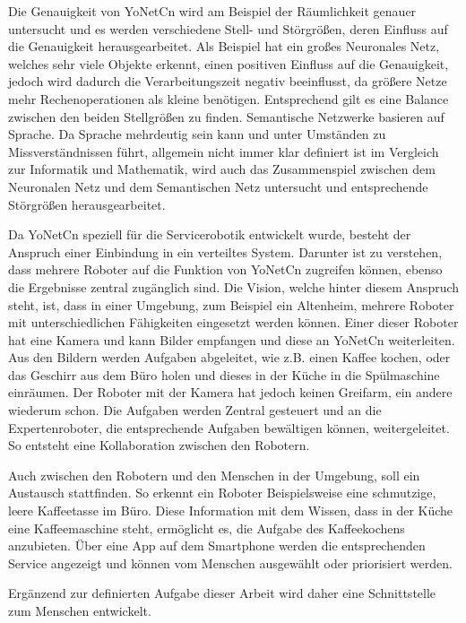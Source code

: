 Die Genauigkeit von YoNetCn wird am Beispiel der Räumlichkeit genauer untersucht und es werden verschiedene Stell- und Störgrößen, deren Einfluss auf die Genauigkeit herausgearbeitet.
Als Beispiel hat ein großes Neuronales Netz, welches sehr viele Objekte erkennt, einen positiven Einfluss auf die Genauigkeit, jedoch wird dadurch die Verarbeitungszeit negativ beeinflusst, da größere Netze mehr Rechenoperationen als kleine benötigen. Entsprechend gilt es eine Balance zwischen den beiden Stellgrößen zu finden. 
Semantische Netzwerke basieren auf Sprache. Da Sprache mehrdeutig sein kann und unter Umständen zu Missverständnissen führt, allgemein nicht immer klar definiert ist im Vergleich zur Informatik und Mathematik, wird auch das Zusammenspiel zwischen dem Neuronalen Netz und dem Semantischen Netz untersucht und entsprechende Störgrößen herausgearbeitet. 


Da YoNetCn speziell für die Servicerobotik entwickelt wurde, besteht der Anspruch einer Einbindung in ein verteiltes System. Darunter ist zu verstehen, dass mehrere Roboter auf die Funktion von YoNetCn zugreifen können, ebenso die Ergebnisse zentral zugänglich sind. Die Vision, welche hinter diesem Anspruch steht, ist, dass in einer Umgebung, zum Beispiel ein Altenheim, mehrere Roboter mit unterschiedlichen Fähigkeiten eingesetzt werden können. Einer dieser Roboter hat eine Kamera und kann Bilder empfangen und diese an YoNetCn weiterleiten. Aus den Bildern werden Aufgaben abgeleitet, wie z.B. einen Kaffee kochen, oder das Geschirr aus dem Büro holen und dieses in der Küche in die Spülmaschine einräumen. Der Roboter mit der Kamera hat jedoch keinen Greifarm, ein andere wiederum schon. Die Aufgaben werden Zentral gesteuert und an die Expertenroboter, die entsprechende Aufgaben bewältigen können, weitergeleitet. So entsteht eine Kollaboration zwischen den Robotern. 

Auch zwischen den Robotern und den Menschen in der Umgebung, soll ein Austausch stattfinden. So erkennt ein Roboter Beispielsweise eine schmutzige, leere Kaffeetasse im Büro. Diese Information mit dem Wissen, dass in der Küche eine Kaffeemaschine steht, ermöglicht es, die Aufgabe des Kaffeekochens anzubieten. Über eine App auf dem Smartphone werden die entsprechenden Service angezeigt und können vom Menschen ausgewählt oder priorisiert werden. 

Ergänzend zur definierten Aufgabe dieser Arbeit wird daher eine Schnittstelle zum Menschen entwickelt. 

